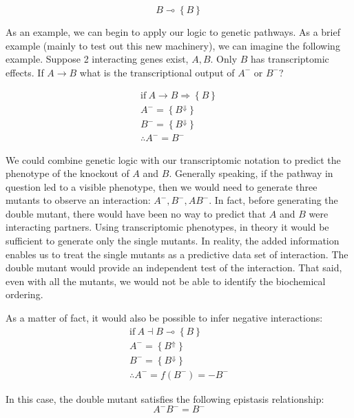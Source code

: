\documentclass{article}
\newcommand{\transcr}[1]{\left \{ #1 \right \}}
\theoremstyle{definition}
\begin{document}
\begin{equation}
  B \multimap \transcr{B}
\end{equation}

As an example, we can begin to apply our logic to genetic pathways. As a brief example (mainly to test out this new machinery), we can imagine the following example. Suppose 2 interacting genes exist, $A, B$. Only $B$ has transcriptomic effects. If $A \longrightarrow B$ what is the transcriptional output of $A^-$ or $B^-$?

\begin{equation}
\begin{aligned}
\textrm{if}~A \rightarrow{} B \Rightarrow \transcr{B}\\
A^- = \transcr{B^\Downarrow}\\
B^- = \transcr{B^\Downarrow}\\
\therefore A^- = B^-
\end{aligned}
\end{equation}

We could combine genetic logic with our transcriptomic notation to predict the phenotype of the knockout of $A$ and $B$. Generally speaking, if the pathway in question led to a visible phenotype, then we would need to generate three mutants to observe an interaction: $A^-, B^-, AB^-$. In fact, before generating the double mutant, there would have been no way to predict that $A$ and $B$ were interacting partners. Using transcriptomic phenotypes, in theory it would be sufficient to generate only the single mutants. In reality, the added information enables us to treat the single mutants as a predictive data set of interaction. The double mutant would provide an independent test of the interaction. That said, even with all the mutants, we would not be able to identify the biochemical ordering.

As a matter of fact, it would also be possible to infer negative interactions:
\begin{equation}
\begin{aligned}
\textrm{if}~A \dashv{} B \multimap \transcr{B}\\
A^- = \transcr{B^\Uparrow}\\
B^- = \transcr{B^\Downarrow}\\
\therefore A^- = f(B^-) = -B^-
\end{aligned}
\end{equation}

In this case, the double mutant satisfies the following epistasis relationship:
\begin{equation}
  A^-B^- = B^-
\end{equation}
\end{document}
